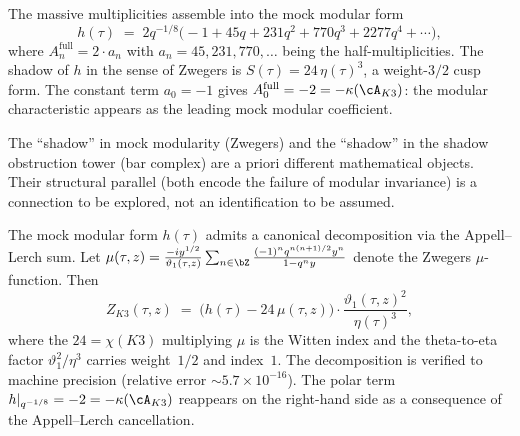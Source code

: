 \begin{remark}
\label{rem:mock-modular-k3}
The massive multiplicities assemble into the mock modular form
\begin{equation}\label{eq:mock-modular-h}
h(\tau) \;=\; 2q^{-1/8}\bigl(-1 + 45q + 231q^2
 + 770q^3 + 2277q^4 + \cdots\bigr),
\end{equation}
where $A_n^{\mathrm{full}} = 2 \cdot a_n$ with $a_n = 45, 231,
770,\ldots$ being the half-multiplicities. The shadow of $h$ in
the sense of Zwegers is $S(\tau) = 24\,\eta(\tau)^3$, a
weight-$3/2$ cusp form. The constant term $a_0 = -1$ gives
$A_0^{\mathrm{full}} = -2 = -\kappa(\cA_{K3})$: the modular
characteristic appears as the leading mock modular coefficient.

The ``shadow'' in mock modularity (Zwegers) and the ``shadow''
in the shadow obstruction tower (bar complex) are a priori
different mathematical objects. Their structural parallel
(both encode the failure of modular invariance) is a
connection to be explored, not an identification to be assumed.

The mock modular form $h(\tau)$ admits a canonical decomposition
via the Appell--Lerch sum. Let
$\mu(\tau,z) = \frac{-iy^{1/2}}{\vartheta_1(\tau,z)}
\sum_{n \in \bZ} \frac{(-1)^n q^{n(n+1)/2} y^n}{1 - q^n y}$
denote the Zwegers $\mu$-function. Then
\begin{equation}\label{eq:mock-modular-decomposition}
Z_{K3}(\tau,z)
\;=\;
\bigl(h(\tau) - 24\,\mu(\tau,z)\bigr)
\cdot \frac{\vartheta_1(\tau,z)^2}{\eta(\tau)^3},
\end{equation}
where the $24 = \chi(K3)$ multiplying $\mu$ is the Witten
index and the theta-to-eta factor
$\vartheta_1^2/\eta^3$ carries weight~$1/2$ and index~$1$.
The decomposition is verified to machine
precision (relative error $\sim 5.7 \times 10^{-16}$).
The polar term $h|_{q^{-1/8}} = -2 = -\kappa(\cA_{K3})$
reappears on the right-hand side as a consequence of the
Appell--Lerch cancellation.
\end{remark}

